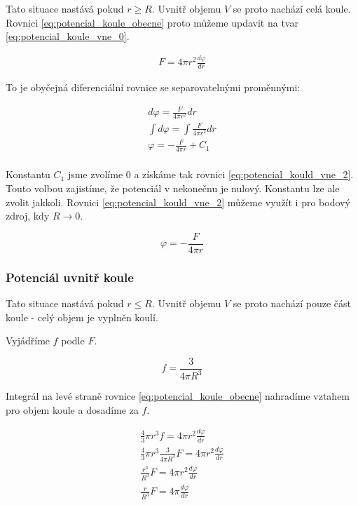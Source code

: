 \documentclass{book}
\begin{document}
Tato situace nastává pokud \(r \geq R\). Uvnitř objemu \(V\) se proto nachází celá koule. Rovnici \eqref{eq:potencial_koule_obecne} proto můžeme updavit na tvar \eqref{eq:potencial_koule_vne_0}.

\begin{equation}
\label{eq:potencial_koule_vne_0}
\begin{split}
F = 4 \pi r^2 \frac{d \varphi}{dr}
\end{split}
\end{equation}

To je obyčejná diferenciální rovnice se separovatelnými proměnnými:

\begin{equation}
\label{eq:potencial_koule_vne_1}
\begin{split}
d \varphi = \frac{F}{4 \pi r^2} dr \\
\int d \varphi = \int \frac{F}{4 \pi r^2} dr \\
\varphi = -\frac{F}{4 \pi r} + C_1 \\
\end{split}
\end{equation}

Konstantu \(C_1\) jsme zvolíme 0 a získáme tak rovnici \eqref{eq:potencial_kould_vne_2}. Touto volbou zajistíme, že potenciál v nekonečnu je nulový. Konstantu lze ale zvolit jakkoli. Rovnici \eqref{eq:potencial_kould_vne_2} můžeme využít i pro bodový zdroj, kdy \(R \rightarrow 0\).

\begin{equation}
\label{eq:potencial_koule_vne_2}
\varphi = -\frac{F}{4 \pi r}
\end{equation}

\subsubsection{Potenciál uvnitř koule}

Tato situace nastává pokud \(r \leq R\). Uvnitř objemu \(V\) se proto nachází pouze část koule - celý objem je vyplněn koulí.

Vyjádříme \(f\) podle \(F\).

\begin{equation}
f = \frac{3}{4 \pi R^3}
\end{equation}

Integrál na levé straně rovnice \eqref{eq:potencial_koule_obecne} nahradíme vztahem pro objem koule a dosadíme za \(f\).

\begin{equation}
\begin{split}
\frac{4}{3} \pi r^3 f = 4 \pi r^2 \frac{d \varphi}{dr} \\
\frac{4}{3} \pi r^3 \frac{3}{4 \pi R^3} F = 4 \pi r^2 \frac{d \varphi}{dr} \\
\frac{r^3}{R^3} F = 4 \pi r^2 \frac{d \varphi}{dr} \\
\frac{r}{R^3} F = 4 \pi \frac{d \varphi}{dr}
\end{split}
\end{equation}
\end{document}
